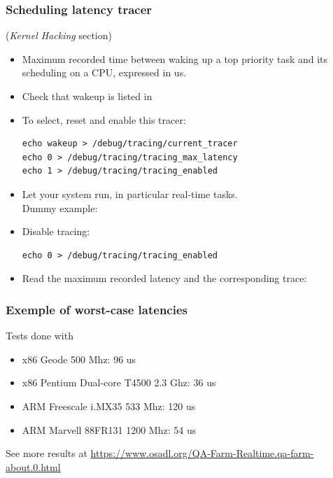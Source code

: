\begin{frame}[fragile]
  \frametitle{Scheduling latency tracer}
  \small
   ({\em Kernel Hacking} section)
  \begin{itemize}
  \item Maximum recorded time between waking up a top priority task
    and its scheduling on a CPU, expressed in us.
  \item Check that wakeup is listed in
  \item To select, reset and enable this tracer:
    \begin{block}{}
\footnotesize
\begin{verbatim}
echo wakeup > /debug/tracing/current_tracer
echo 0 > /debug/tracing/tracing_max_latency
echo 1 > /debug/tracing/tracing_enabled
\end{verbatim}
\small
    \end{block}
  \item Let your system run, in particular real-time tasks.\\
    Dummy example: 
  \item Disable tracing:\\
    \begin{block}{}
\footnotesize
\begin{verbatim}
echo 0 > /debug/tracing/tracing_enabled
\end{verbatim}
\small
    \end{block}{}
  \item Read the maximum recorded latency and the corresponding trace:\\
  \end{itemize}
\end{frame}

\begin{frame}
  \frametitle{Exemple of worst-case latencies}
  Tests done with 
  \begin{itemize}
  \item x86 Geode 500 Mhz: 96 us
  \item x86 Pentium Dual-core T4500 2.3 Ghz: 36 us
  \item ARM Freescale i.MX35 533 Mhz: 120 us
  \item ARM Marvell 88FR131 1200 Mhz: 54 us
  \end{itemize}
  See more results at
  \url{https://www.osadl.org/QA-Farm-Realtime.qa-farm-about.0.html}
\end{frame}

